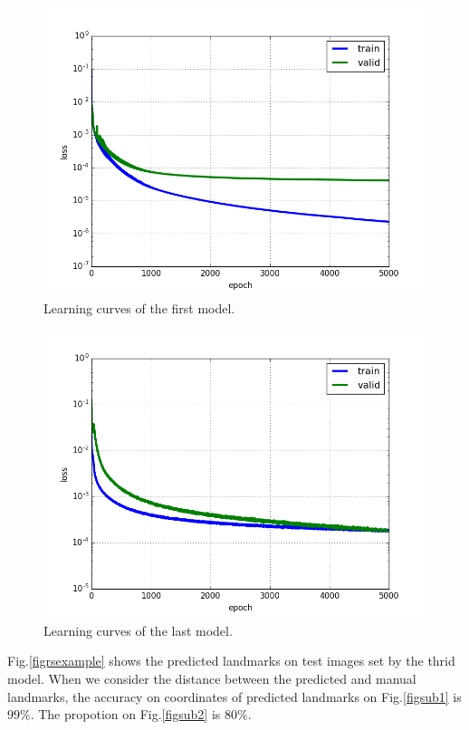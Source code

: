 \documentclass[conference]{IEEEtran}
\begin{document}
\begin{figure}[htbp]
	\centerline{\includegraphics[scale=0.32]{images/loss_model_1}}
	\caption{Learning curves of the first model.}
	\label{figloss1}
\end{figure}
\begin{figure}[htbp]
	\centerline{\includegraphics[scale=0.32]{images/loss_v16}}
	\caption{Learning curves of the last model.}
	\label{figloss}
\end{figure}
Fig.\ref{figrsexample} shows the predicted landmarks on test images set by the thrid model. When we consider the distance between the predicted and manual landmarks, the accuracy on coordinates of predicted landmarks on Fig.\ref{figsub1} is $99\%$. The propotion on Fig.\ref{figsub2} is $80\%$.
\end{document}
